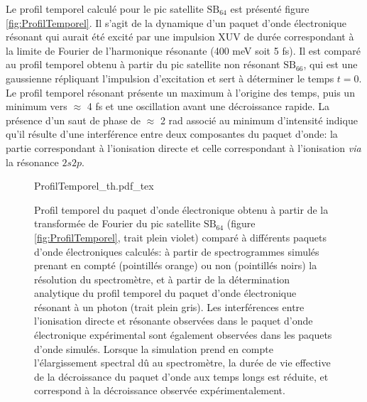 Le profil temporel calculé pour le pic satellite $\text{SB}_{64}$ est présenté figure \ref{fig:ProfilTemporel}. Il s'agit de la dynamique d'un paquet d'onde électronique résonant qui aurait été excité par une impulsion XUV de durée correspondant à la limite de Fourier de l'harmonique résonante (400 meV soit 5 fs). Il est comparé au profil temporel obtenu à partir du pic satellite non résonant $\text{SB}_{66}$, qui est une gaussienne répliquant l'impulsion d'excitation et sert à déterminer le temps $t = 0$. Le profil temporel résonant présente un maximum à l'origine des temps, puis un minimum vers $\approx$ 4 fs et une oscillation avant une décroissance rapide. La présence d'un saut de phase de $\approx$ 2 rad associé au minimum d'intensité indique qu'il résulte d'une interférence entre deux composantes du paquet d'onde: la partie correspondant à l'ionisation directe et celle correspondant à l'ionisation \textit{via} la résonance $2s2p$. 

\begin{figure}
\centering
\def\svgwidth{0.7\textwidth}
{ProfilTemporel_th.pdf_tex}
\caption{Profil temporel du paquet d'onde électronique obtenu à partir de la transformée de Fourier du pic satellite $\text{SB}_{64}$ (figure \ref{fig:ProfilTemporel}, trait plein violet) comparé à différents paquets d'onde électroniques calculés: à partir de spectrogrammes simulés prenant en compté (pointillés orange) ou non (pointillés noirs) la résolution du spectromètre, et à partir de la détermination analytique du profil temporel du paquet d'onde électronique résonant à un photon (trait plein gris). Les interférences entre l'ionisation directe et résonante observées dans le paquet d'onde électronique expérimental sont également observées dans les paquets d'onde simulés. Lorsque la simulation prend en compte l'élargissement spectral dû au spectromètre, la durée de vie effective de la décroissance du paquet d'onde aux temps longs est réduite, et correspond à la décroissance observée expérimentalement.} 
\label{fig:ProfilTemporel_th}
\end{figure}

